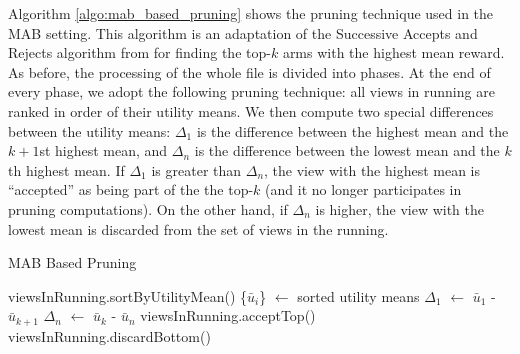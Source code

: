 Algorithm \ref{algo:mab_based_pruning} shows the pruning technique used in the
MAB setting.
This algorithm is an adaptation of the Successive Accepts and Rejects
algorithm from \cite{BubeckWV13} for finding the top-$k$ arms with the highest
mean reward.
As before, the processing of the whole file is divided into phases.
At the end of every phase, we adopt the following pruning technique: all views
in running are ranked in order of their utility means. 
We then compute two special differences between the utility means: $\Delta_1$
is the difference between the highest mean and the $k+1$st highest mean, and
$\Delta_n$ is the difference between the lowest mean and the $k$th highest mean.
If $\Delta_1$ is greater than $\Delta_n$, the view with the highest mean is
``accepted'' as being part of the the top-$k$ (and it no longer participates
in pruning computations).
On the other hand, if $\Delta_n$ is higher, the view with the lowest mean is discarded
from the set of views in the running.


\begin{algorithm}
\caption{MAB Based Pruning}
\label{algo:mab_based_pruning}
\begin{algorithmic}[1]
\State viewsInRunning.sortByUtilityMean()
\State \{$\bar{u}_{i}$\} $\gets$ sorted utility means
\State $\Delta_1$ $\gets$ $\bar{u}_{1}$ - $\bar{u}_{k+1}$
\State $\Delta_n$ $\gets$ $\bar{u}_{k}$ - $\bar{u}_{n}$
\State viewsInRunning.acceptTop()
\Else
\State viewsInRunning.discardBottom()
\EndIf
\end{algorithmic}
\end{algorithm}

